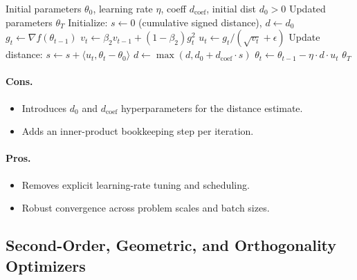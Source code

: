 \begin{algorithm}[H]
\caption{Prodigy (Approximating the Distance Estimate)}
\label{alg:prodigy}
\begin{algorithmic}[1]
\Require Initial parameters $\theta_0$, learning rate $\eta$, coeff $d_{\text{coef}}$, initial dist $d_0 > 0$
\Ensure Updated parameters $\theta_T$
\State Initialize: $s \gets 0$ (cumulative signed distance), $d \gets d_0$
    \State $g_t \gets \nabla f(\theta_{t-1})$
    \State $v_t \gets \beta_2 v_{t-1} + (1-\beta_2) g_t^2$ 
    \State $u_t \gets g_t / (\sqrt{v_t} + \epsilon)$ 
    \State Update distance: $s \gets s + \langle u_t, \theta_t - \theta_0 \rangle$ 
    \State $d \gets \max(d, d_0 + d_{\text{coef}} \cdot s)$ 
    \State $\theta_t \gets \theta_{t-1} - \eta \cdot d \cdot u_t$ 
\EndFor
\Return $\theta_T$
\end{algorithmic}
\end{algorithm}

\paragraph{Cons.}
\begin{itemize}[leftmargin=*]
\item Introduces $d_0$ and $d_{\text{coef}}$ hyperparameters for the distance estimate.
\item Adds an inner-product bookkeeping step per iteration.
\end{itemize}

\paragraph{Pros.}
\begin{itemize}[leftmargin=*]
\item Removes explicit learning-rate tuning and scheduling.
\item Robust convergence across problem scales and batch sizes.
\end{itemize}

\subsection{Second-Order, Geometric, and Orthogonality Optimizers}
